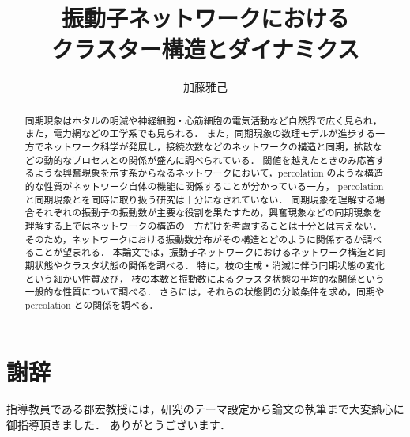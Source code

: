 \documentclass[system, bachelor]{systemB}%
\title{振動子ネットワークにおける\\クラスター構造とダイナミクス}
\author{加藤雅己}
\theoremstyle{break}
\begin{document}
\maketitle%

\frontmatter%



\begin{abstract}%
  同期現象はホタルの明滅や神経細胞・心筋細胞の電気活動など自然界で広く見られ，また，電力網などの工学系でも見られる．
  また，同期現象の数理モデルが進歩する一方でネットワーク科学が発展し，接続次数などのネットワークの構造と同期，拡散などの動的なプロセスとの関係が盛んに調べられている．  
  閾値を越えたときのみ応答するような興奮現象を示す系からなるネットワークにおいて，percolation のような構造的な性質がネットワーク自体の機能に関係することが分かっている一方，
  percolation と同期現象とを同時に取り扱う研究は十分になされていない．
  同期現象を理解する場合それぞれの振動子の振動数が主要な役割を果たすため，興奮現象などの同期現象を理解する上ではネットワークの構造の一方だけを考慮することは十分とは言えない．
  そのため，ネットワークにおける振動数分布がその構造とどのように関係するか調べることが望まれる．
  本論文では，振動子ネットワークにおけるネットワーク構造と同期状態やクラスタ状態の関係を調べる．
  特に，枝の生成・消滅に伴う同期状態の変化という細かい性質及び，
  枝の本数と振動数によるクラスタ状態の平均的な関係という一般的な性質について調べる．
  さらには，それらの状態間の分岐条件を求め，同期や percolation との関係を調べる．
\end{abstract}


{\makeatletter
\let\ps@jpl@in\ps@empty
\makeatother
\pagestyle{empty}
\tableofcontents
\clearpage}

\mainmatter%






\backmatter%
\chapter{謝辞}%
指導教員である郡宏教授には，研究のテーマ設定から論文の執筆まで大変熱心に御指導頂きました．
ありがとうございます．


\appendix%

\end{document}
